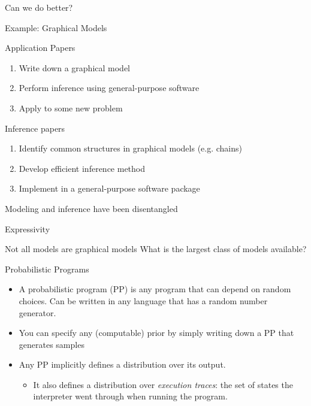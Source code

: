 \begin{frame}{Can we do better?}
  \begin{block}{Example: Graphical Models}  
  \end{block}
      \begin{block}{Application Papers}
      \begin{enumerate}
        \item Write down a graphical model
        \item Perform inference using general-purpose software
        \item Apply to some new problem
      \end{enumerate}
    \end{block}
      \begin{block}{Inference papers}
      \begin{enumerate}
        \item Identify common structures in graphical models (e.g. chains)
        \item Develop efficient inference method
        \item Implement in a general-purpose software package
      \end{enumerate}
    \end{block}  
  \begin{block}{}
      \vspace{-2\baselineskip}
  \large
    \begin{center}
    {
      {Modeling and inference have been disentangled}
    }	
    \end{center}
  \end{block}
\end{frame}



\begin{frame}{Expressivity}
  \begin{block}{Not all models are graphical models}  
  What is the largest class of models available?
  \end{block}
  \vspace{\baselineskip}
  \begin{block}{Probabilistic Programs}
      \begin{itemize}
        \item A probabilistic program (PP) is any program that can depend on random choices.  Can be written in any language that has a random number generator.
        \item You can specify any (computable) prior by simply writing down a PP that generates samples
        \item Any PP implicitly defines a distribution over its output.
        \begin{itemize}
		     \item It also defines a distribution over \emph{execution traces}: the set of states the interpreter went through when running the program.
        \end{itemize}
      \end{itemize}
    \end{block}
\end{frame}

